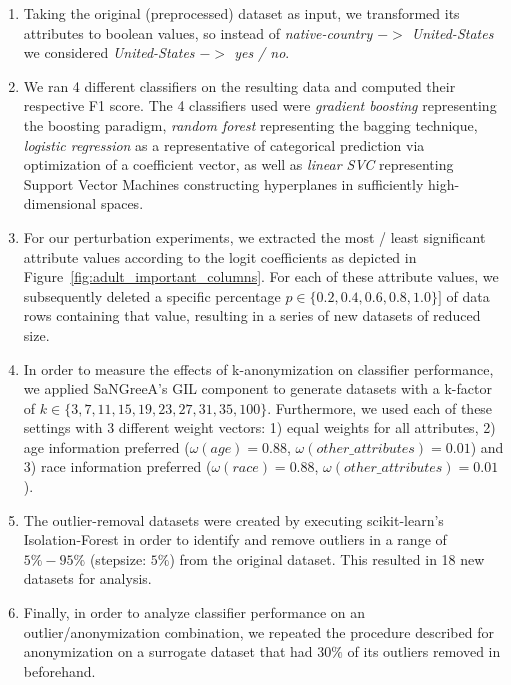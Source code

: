\documentclass{llncs}
\begin{document}
\begin{enumerate}
	\item Taking the original (preprocessed) dataset as input, we transformed its attributes to boolean values, so instead of \textit{native-country $->$ United-States} we considered \textit{United-States $->$ yes / no}.
	\item We ran 4 different classifiers on the resulting data and computed their respective F1 score. The 4 classifiers used were \textit{gradient boosting} representing the boosting paradigm, \textit{random forest} representing the bagging technique, \textit{logistic regression} as a representative of categorical prediction via optimization of a coefficient vector, as well as \textit{linear SVC} representing Support Vector Machines constructing hyperplanes in sufficiently high-dimensional spaces.
	\item For our perturbation experiments, we extracted the most / least significant attribute values according to the logit coefficients as depicted in Figure~\ref{fig:adult_important_columns}. For each of these attribute values, we subsequently deleted a specific percentage $p \in \{0.2, 0.4, 0.6, 0.8, 1.0 \}]$ of data rows containing that value, resulting in a series of new datasets of reduced size.
	\item In order to measure the effects of k-anonymization on classifier performance, we applied SaNGreeA's GIL component to generate datasets with a k-factor of $k \in \{3, 7, 11, 15, 19, 23, 27, 31, 35, 100\}$. Furthermore, we used each of these settings with 3 different weight vectors: 1) equal weights for all attributes, 2) age information preferred ($\omega(age)=0.88$, $\omega(other\_attributes)=0.01$) and 3) race information preferred ($\omega(race)=0.88$, $\omega(other\_attributes)=0.01$).
	\item The outlier-removal datasets were created by executing scikit-learn's Isolation-Forest in order to identify and remove outliers in a range of $5\% - 95\%$ (stepsize: $5\%$) from the original dataset. This resulted in 18 new datasets for analysis.
	\item Finally, in order to analyze classifier performance on an outlier/anonymization combination, we repeated the procedure described for anonymization on a surrogate dataset that had $30\%$ of its outliers removed in beforehand.
\end{enumerate}
\end{document}
